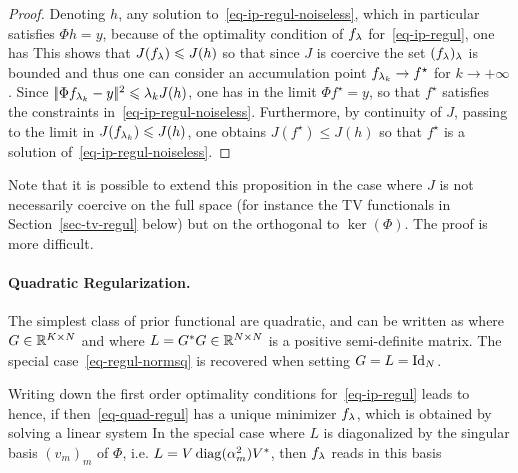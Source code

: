 \begin{proof}
	Denoting $h$, any solution to~\eqref{eq-ip-regul-noiseless}, which in particular satisfies $\Phi h = y$, because of the optimality condition of $f_\lambda$ for~\eqref{eq-ip-regul}, one has
	This shows that $J(f_\lambda) \leqslant J(h)$ so that since $J$ is coercive the set $(f_\lambda)_\lambda$ is bounded and thus one can consider an accumulation point $f_{\lambda_k} \rightarrow f^\star$ for $k \rightarrow +\infty$.  Since $|\!| \Phi f_{\lambda_k}-y |\!|^2 \leqslant \lambda_k J(h)$, one has in the limit $\Phi f^\star = y$, so that $f^\star$ satisfies the constraints in~\eqref{eq-ip-regul-noiseless}. Furthermore, by continuity of $J$, passing to the limit in $J(f_{\lambda_k}) \leqslant J(h)$, one obtains $J(f^\star) \leq J(h)$ so that $f^\star$ is a solution of~\eqref{eq-ip-regul-noiseless}. 
\end{proof}

Note that it is possible to extend this proposition in the case where $J$ is not necessarily coercive on the full space (for instance the TV functionals in Section~\ref{sec-tv-regul} below) but on the orthogonal to $\ker(\Phi)$. The proof is more difficult.


\paragraph{Quadratic Regularization.}

The simplest class of prior functional are quadratic, and can be written as
where $G \in \mathbb{R}^{K \times N}$ and 
where $L=G^*G \in \mathbb{R}^{N \times N}$ is a positive semi-definite matrix.
%
The special case~\eqref{eq-regul-normsq} is recovered when setting $G=L=\mathrm{Id}_N$. 

Writing down the first order optimality conditions for~\eqref{eq-ip-regul} leads to
hence, if
then~\eqref{eq-quad-regul} has a unique minimizer $f_\lambda$, which is obtained by solving a linear system
In the special case where $L$ is diagonalized by the singular basis $(v_m)_m$ of $\Phi$, i.e. $L=V \operatorname{diag}(\alpha_m^2) V^*$, then $f_\lambda$ reads in this basis 


